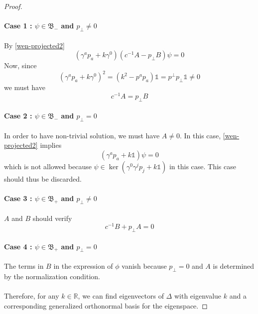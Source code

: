 \begin{proof}
\paragraph{Case 1 : $\psi \in \mathfrak{B}_-$ and $p_\bot \neq 0$} 
By \cref{wen-projected2}
\begin{equation*}
(\gamma^a p_a + k\gamma^0)(c^{-1}A - p_\bot B) \psi = 0
\end{equation*}
Now, since 
\begin{equation*}
(\gamma^a p_a + k\gamma^0)^2 = ( k^2 - p^a p_a ) \mathbb{1}= p^\bot p_\bot \mathbb{1} \neq 0
\end{equation*}
we must have 
\begin{equation*}
c^{-1} A = p_\bot B
\end{equation*}
\paragraph{Case 2 : $\psi \in \mathfrak{B}_-$ and $p_\bot = 0$}
In order to have non-trivial solution, 
we must have $A \neq 0$. 
In this case, 
\cref{wen-projected2} implies 
\begin{equation*}
(\gamma^a p_a + k \mathbb{1})\psi = 0
\end{equation*}
which is not allowed because $\psi\in\ker(\gamma^0\gamma^jp_j + k\mathbb{1})$ in this case. 
This case should thus be discarded.
\paragraph{Case 3 : $\psi \in \mathfrak{B}_+$ and $p_\bot \neq 0$}
$A$ and $B$ should verify 
\begin{equation*}
c^{-1} B + p_\bot A = 0
\end{equation*}
\paragraph{Case 4 : $\psi \in \mathfrak{B}_+$ and $p_\bot = 0$}
The terms in $B$ in the expression of $\phi$ vanish because  $p_\perp = 0$ and $A$ is determined by the normalization condition.
\\\\
Therefore, for any $k\in\mathbb{R}$, 
we can find eigenvectors of $\Delta$ with eigenvalue $k$ and a corresponding generalized orthonormal basis for the eigenspace.
\end{proof}